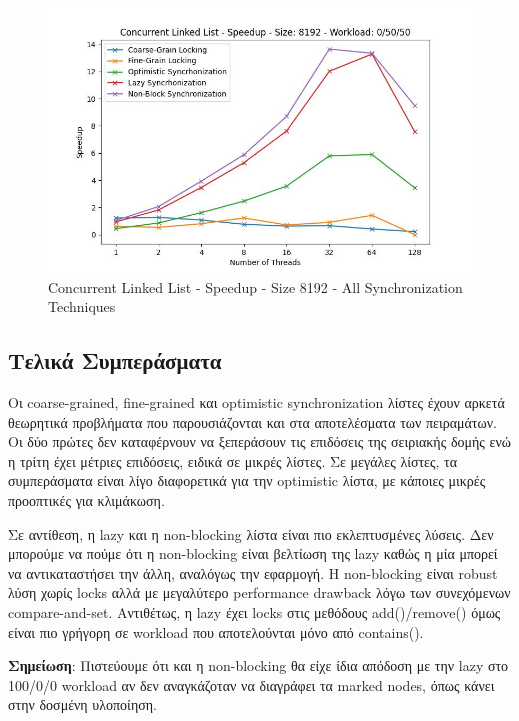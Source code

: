 \documentclass[../final_report.tex]{subfiles}
\begin{document}
\begin{figure}[H]
        \includegraphics[scale=0.4]{outFiles/plots/concurrent_data_structs_all_speedup_8192_0_50_50.jpg}
    \caption{Concurrent Linked List - Speedup - Size 8192 - All Synchronization Techniques}
    \label{fig:Concurrent Linked List - Speedup - Size 8192 - All Synchronization Techniques}
\end{figure}

\subsection*{Τελικά Συμπεράσματα}
Οι coarse-grained, fine-grained και optimistic synchronization λίστες έχουν αρκετά θεωρητικά προβλήματα που παρουσιάζονται
και στα αποτελέσματα των πειραμάτων. Οι δύο πρώτες δεν καταφέρνουν να ξεπεράσουν τις επιδόσεις της σειριακής δομής ενώ η τρίτη
έχει μέτριες επιδόσεις, ειδικά σε μικρές λίστες. Σε μεγάλες λίστες, τα συμπεράσματα είναι λίγο διαφορετικά για την optimistic λίστα, με
κάποιες μικρές προοπτικές για κλιμάκωση.

Σε αντίθεση, η lazy και η non-blocking λίστα είναι πιο εκλεπτυσμένες λύσεις.
Δεν μπορούμε να πούμε ότι η non-blocking είναι βελτίωση της lazy καθώς η μία μπορεί να αντικαταστήσει την άλλη, αναλόγως την εφαρμογή.
Η non-blocking είναι robust λύση χωρίς locks αλλά με μεγαλύτερο performance drawback λόγω των συνεχόμενων compare-and-set. Αντιθέτως, η
lazy έχει locks στις μεθόδους add()/remove() όμως είναι πιο γρήγορη σε workload που αποτελούνται μόνο από contains().

\textbf{Σημείωση}: Πιστεύουμε ότι και η non-blocking θα είχε ίδια απόδοση με την lazy στο 100/0/0 workload αν δεν αναγκάζοταν να διαγράφει
τα marked nodes, όπως κάνει στην δοσμένη υλοποίηση.
\end{document}
